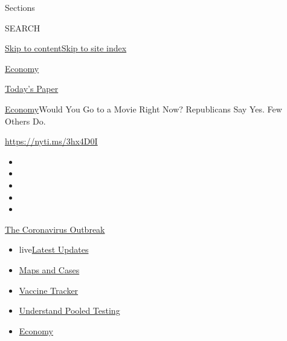 Sections

SEARCH

\protect\hyperlink{site-content}{Skip to
content}\protect\hyperlink{site-index}{Skip to site index}

\href{https://www.nytimes.com/section/business/economy}{Economy}

\href{https://myaccount.nytimes.com/auth/login?response_type=cookie\&client_id=vi}{}

\href{https://www.nytimes.com/section/todayspaper}{Today's Paper}

\href{/section/business/economy}{Economy}\textbar{}Would You Go to a
Movie Right Now? Republicans Say Yes. Few Others Do.

\url{https://nyti.ms/3hx4D0I}

\begin{itemize}
\item
\item
\item
\item
\item
\end{itemize}

\href{https://www.nytimes.com/news-event/coronavirus?action=click\&pgtype=Article\&state=default\&region=TOP_BANNER\&context=storylines_menu}{The
Coronavirus Outbreak}

\begin{itemize}
\tightlist
\item
  live\href{https://www.nytimes.com/2020/07/29/world/coronavirus-covid-19.html?action=click\&pgtype=Article\&state=default\&region=TOP_BANNER\&context=storylines_menu}{Latest
  Updates}
\item
  \href{https://www.nytimes.com/interactive/2020/us/coronavirus-us-cases.html?action=click\&pgtype=Article\&state=default\&region=TOP_BANNER\&context=storylines_menu}{Maps
  and Cases}
\item
  \href{https://www.nytimes.com/interactive/2020/science/coronavirus-vaccine-tracker.html?action=click\&pgtype=Article\&state=default\&region=TOP_BANNER\&context=storylines_menu}{Vaccine
  Tracker}
\item
  \href{https://www.nytimes.com/interactive/2020/07/27/upshot/coronavirus-pooled-testing.html?action=click\&pgtype=Article\&state=default\&region=TOP_BANNER\&context=storylines_menu}{Understand
  Pooled Testing}
\item
  \href{https://www.nytimes.com/live/2020/07/29/business/stock-market-today-coronavirus?action=click\&pgtype=Article\&state=default\&region=TOP_BANNER\&context=storylines_menu}{Economy}
\end{itemize}


